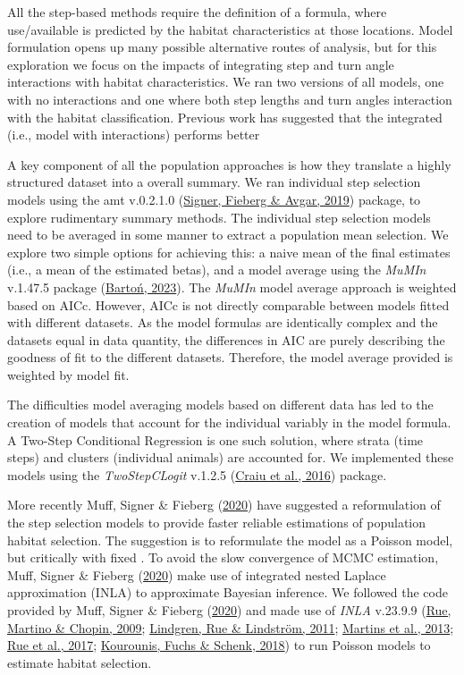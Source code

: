 \documentclass[10pt,a4paper]{article}
\begin{document}
All the step-based methods require the definition of a formula, where use/available is predicted by the habitat characteristics at those locations.
Model formulation opens up many possible alternative routes of analysis, but for this exploration we focus on the impacts of integrating step and turn angle interactions with habitat characteristics.
We ran two versions of all models, one with no interactions and one where both step lengths and turn angles interaction with the habitat classification.
Previous work has suggested that the integrated (i.e., model with interactions) performs better

A key component of all the population approaches is how they translate a highly structured dataset into a overall summary.
We ran individual step selection models using the amt v.0.2.1.0 (\protect\hyperlink{ref-amt}{Signer, Fieberg \& Avgar, 2019}) package, to explore rudimentary summary methods.
The individual step selection models need to be averaged in some manner to extract a population mean selection.
We explore two simple options for achieving this: a naive mean of the final estimates (i.e., a mean of the estimated betas), and a model average using the \emph{MuMIn} v.1.47.5 package (\protect\hyperlink{ref-MuMIn}{Bartoń, 2023}).
The \emph{MuMIn} model average approach is weighted based on AICc.
However, AICc is not directly comparable between models fitted with different datasets.
As the model formulas are identically complex and the datasets equal in data quantity, the differences in AIC are purely describing the goodness of fit to the different datasets.
Therefore, the model average provided is weighted by model fit.

The difficulties model averaging models based on different data has led to the creation of models that account for the individual variably in the model formula.
A Two-Step Conditional Regression is one such solution, where strata (time steps) and clusters (individual animals) are accounted for.
We implemented these models using the \emph{TwoStepCLogit} v.1.2.5 (\protect\hyperlink{ref-TwoStepCLogit}{Craiu et al., 2016}) package.

More recently Muff, Signer \& Fieberg (\protect\hyperlink{ref-muff_accounting_2020}{2020}) have suggested a reformulation of the step selection models to provide faster reliable estimations of population habitat selection.
The suggestion is to reformulate the model as a Poisson model, but critically with fixed .
To avoid the slow convergence of MCMC estimation, Muff, Signer \& Fieberg (\protect\hyperlink{ref-muff_accounting_2020}{2020}) make use of integrated nested Laplace approximation (INLA) to approximate Bayesian inference.
We followed the code provided by Muff, Signer \& Fieberg (\protect\hyperlink{ref-muff_accounting_2020}{2020}) and made use of \emph{INLA} v.23.9.9 (\protect\hyperlink{ref-rue_approximate_2009}{Rue, Martino \& Chopin, 2009}; \protect\hyperlink{ref-lindgren_explicit_2011}{Lindgren, Rue \& Lindström, 2011}; \protect\hyperlink{ref-martins_bayesian_2013}{Martins et al., 2013}; \protect\hyperlink{ref-rue_bayesian_2017}{Rue et al., 2017}; \protect\hyperlink{ref-kourounis_towards_2018}{Kourounis, Fuchs \& Schenk, 2018}) to run Poisson models to estimate habitat selection.
\end{document}
